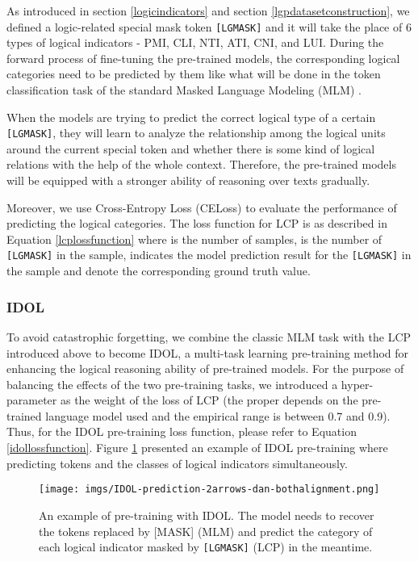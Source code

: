 \documentclass[11pt]{article}
\begin{document}
As introduced in section \ref{logicindicators} and section \ref{lgpdatasetconstruction}, we defined a logic-related special mask token \texttt{[LGMASK]} and it will take the place of 6 types of logical indicators - PMI, CLI, NTI, ATI, CNI, and LUI. During the forward process of fine-tuning the pre-trained models, the corresponding logical categories need to be predicted by them like what will be done in the token classification task of the standard Masked Language Modeling (MLM) \cite{bert}.

When the models are trying to predict the correct logical type of a certain \texttt{[LGMASK]}, they will learn to analyze the relationship among the logical units around the current special token and whether there is some kind of logical relations with the help of the whole context. Therefore, the pre-trained models will be equipped with a stronger ability of reasoning over texts gradually. 

Moreover, we use Cross-Entropy Loss (CELoss) to evaluate the performance of predicting the logical categories. The loss function for LCP is as described in Equation \eqref{lcplossfunction} where  is the number of samples,  is the number of \texttt{[LGMASK]} in the  sample,  indicates the model prediction result for the  \texttt{[LGMASK]} in the  sample and  denote the corresponding ground truth value.



\subsubsection{IDOL} To avoid catastrophic forgetting, we combine the classic MLM task with the LCP introduced above to become IDOL, a multi-task learning pre-training method for enhancing the logical reasoning ability of pre-trained models. For the purpose of balancing the effects of the two pre-training tasks, we introduced a hyper-parameter  as the weight of the loss of LCP (the proper  depends on the pre-trained language model used and the empirical range is between 0.7 and 0.9). Thus, for the IDOL pre-training loss function, please refer to Equation \eqref{idollossfunction}. Figure \ref{fig:idolcase} presented an example of IDOL pre-training where predicting tokens and the classes of logical indicators simultaneously.





\begin{figure}
\centering
\texttt{[image: imgs/IDOL-prediction-2arrows-dan-bothalignment.png]}
\caption{An example of pre-training with IDOL. The model needs to recover the tokens replaced by [MASK] (MLM) and predict the category of each logical indicator masked by \texttt{[LGMASK]} (LCP) in the meantime.}
\label{fig:idolcase}
\end{figure}
\end{document}

